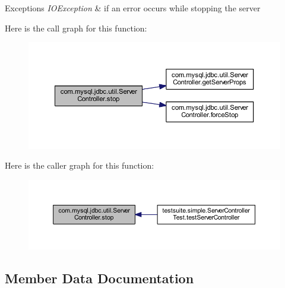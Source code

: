 \begin{DoxyExceptions}{Exceptions}
{\em I\+O\+Exception} & if an error occurs while stopping the server \\
\hline
\end{DoxyExceptions}
Here is the call graph for this function\+:
\nopagebreak
\begin{figure}[H]
\begin{center}
\leavevmode
\includegraphics[width=350pt]{classcom_1_1mysql_1_1jdbc_1_1util_1_1_server_controller_a5a5c3f6222dbf1172ce2537456118925_cgraph}
\end{center}
\end{figure}
Here is the caller graph for this function\+:
\nopagebreak
\begin{figure}[H]
\begin{center}
\leavevmode
\includegraphics[width=350pt]{classcom_1_1mysql_1_1jdbc_1_1util_1_1_server_controller_a5a5c3f6222dbf1172ce2537456118925_icgraph}
\end{center}
\end{figure}


\subsection{Member Data Documentation}
\mbox{\label{classcom_1_1mysql_1_1jdbc_1_1util_1_1_server_controller_a51fa2773730e6933b1baa8610bb91017}} 
